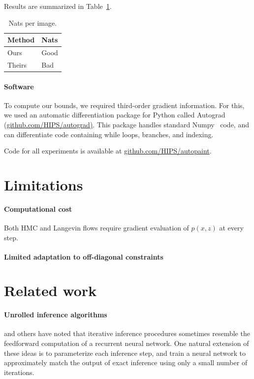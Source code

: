 \documentclass{article}
\begin{document}
Results are summarized in Table~\ref{table:mnist results}.
%
\begin{table}
\begin{center}
\begin{tabular}{l|l}
Method & Nats \\
\midrule
Ours & Good \\
Theirs & Bad
\end{tabular}
\label{table:mnist results}
\caption{Nats per image.}
\end{center}
\end{table}

\paragraph{Software}
To compute our bounds, we required third-order gradient information.
For this, we used an automatic differentiation package for Python called Autograd (\url{github.com/HIPS/autograd)}.
This package handles standard Numpy~\citep{oliphant2007python} code, and can differentiate code containing while loops, branches, and indexing.

Code for all experiments is available at \url{github.com/HIPS/autopaint}.

\section{Limitations}
\label{sec:limitations}


\paragraph{Computational cost}
Both HMC and Langevin flows require gradient evaluation of $p(x,z)$ at every step.


\paragraph{Limited adaptation to off-diagonal constraints}



\section{Related work}

\paragraph{Unrolled inference algorithms}
\citet{hershey2014deep} and others have noted that iterative inference procedures sometimes resemble the feedforward computation of a recurrent neural network.
One natural extension of these ideas is to parameterize each inference step, and train a neural network to approximately match the output of exact inference using only a small number of iterations.
\end{document}
